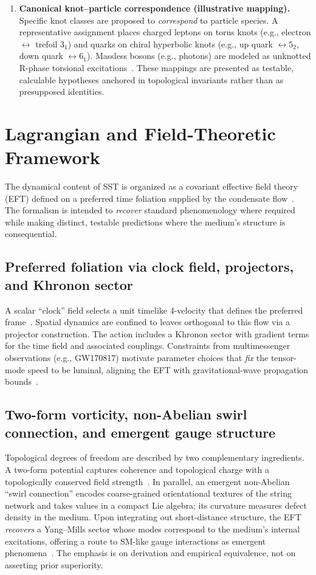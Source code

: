 \documentclass[10pt,reprint,aps,onecolumn,nofootinbib]{revtex4-2}
\begin{document}
\begin{enumerate}
        \item \textbf{Canonical knot–particle correspondence (illustrative mapping).} Specific knot classes are proposed to \emph{correspond} to particle species. A representative assignment places charged leptons on torus knots (e.g., electron $\leftrightarrow$ trefoil $3_1$) and quarks on chiral hyperbolic knots (e.g., up quark $\leftrightarrow 5_2$, down quark $\leftrightarrow 6_1$). Massless bosons (e.g., photons) are modeled as unknotted R-phase torsional excitations~\cite{1,4}. These mappings are presented as testable, calculable hypotheses anchored in topological invariants rather than as presupposed identities.
        \end{enumerate}

\section{Lagrangian and Field-Theoretic Framework}
    \label{sec:lagrangian}
    The dynamical content of SST is organized as a covariant effective field theory (EFT) defined on a preferred time foliation supplied by the condensate flow~\cite{4}. The formalism is intended to \emph{recover} standard phenomenology where required while making distinct, testable predictions where the medium’s structure is consequential.

    \subsection*{Preferred foliation via clock field, projectors, and Khronon sector}
        A scalar ``clock'' field selects a unit timelike 4-velocity that defines the preferred frame~\cite{4}. Spatial dynamics are confined to leaves orthogonal to this flow via a projector construction. The action includes a Khronon sector with gradient terms for the time field and associated couplings. Constraints from multimessenger observations (e.g., GW170817) motivate parameter choices that \emph{fix} the tensor-mode speed to be luminal, aligning the EFT with gravitational-wave propagation bounds~\cite{4}.

    \subsection*{Two-form vorticity, non-Abelian swirl connection, and emergent gauge structure}
        Topological degrees of freedom are described by two complementary ingredients. A two-form potential captures coherence and topological charge with a topologically conserved field strength~\cite{4}. In parallel, an emergent non-Abelian ``swirl connection'' encodes coarse-grained orientational textures of the string network and takes values in a compact Lie algebra; its curvature measures defect density in the medium. Upon integrating out short-distance structure, the EFT \emph{recovers} a Yang–Mills sector whose modes correspond to the medium’s internal excitations, offering a route to SM-like gauge interactions as emergent phenomena~\cite{1,4}. The emphasis is on derivation and empirical equivalence, not on asserting prior superiority.
\end{document}
